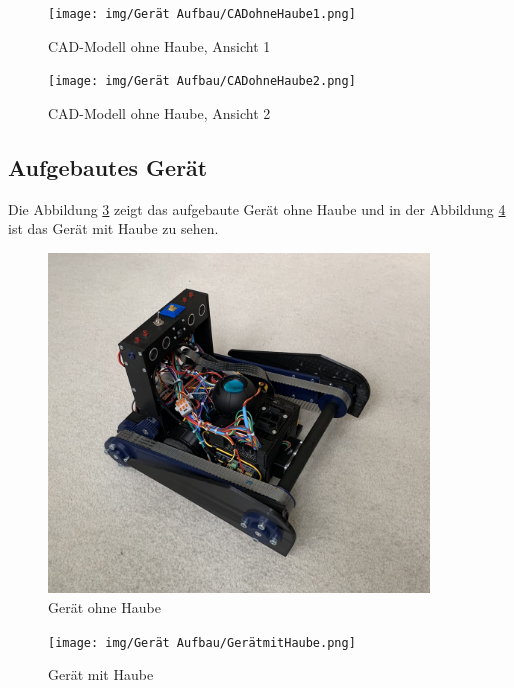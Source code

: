 \begin{figure}[H]
  \texttt{[image: img/Gerät Aufbau/CADohneHaube1.png]}
  \centering
  \caption{CAD-Modell ohne Haube, Ansicht 1}
  \label{fig:CADohneHaube1}
\end{figure}

\begin{figure}[H]
  \texttt{[image: img/Gerät Aufbau/CADohneHaube2.png]}
  \centering
  \caption{CAD-Modell ohne Haube, Ansicht 2}
  \label{fig:CADohneHaube2}
\end{figure}


\subsection{Aufgebautes Gerät}

Die Abbildung \ref{fig:GerätohneHaube} zeigt das aufgebaute Gerät ohne Haube und in der Abbildung \ref{fig:GerätmitHaube} ist das Gerät mit Haube zu sehen. 

\newpage

\begin{figure}[H]
  \includegraphics[width=0.9\textwidth]{img/Gerät Aufbau/GerätohneHaube.png}
  \centering
  \caption{Gerät ohne Haube}
  \label{fig:GerätohneHaube}
\end{figure}

\newpage

\begin{figure}[H]
  \texttt{[image: img/Gerät Aufbau/GerätmitHaube.png]}
  \centering
  \caption{Gerät mit Haube}
  \label{fig:GerätmitHaube}
\end{figure}                        
\newpage

